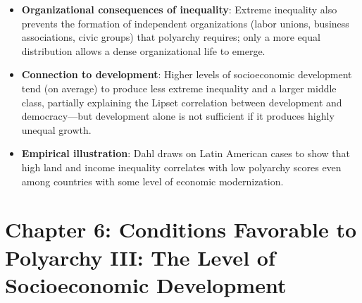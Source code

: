 \documentclass[12pt]{article}
\begin{document}
\begin{itemize}[leftmargin=*, itemsep=4pt]
    \item \textbf{Organizational consequences of inequality}: Extreme inequality also prevents the formation of independent organizations (labor unions, business associations, civic groups) that polyarchy requires; only a more equal distribution allows a dense organizational life to emerge.
    \item \textbf{Connection to development}: Higher levels of socioeconomic development tend (on average) to produce less extreme inequality and a larger middle class, partially explaining the Lipset correlation between development and democracy---but development alone is not sufficient if it produces highly unequal growth.
    \item \textbf{Empirical illustration}: Dahl draws on Latin American cases to show that high land and income inequality correlates with low polyarchy scores even among countries with some level of economic modernization.
\end{itemize}

\section{Chapter 6: Conditions Favorable to Polyarchy III: The Level of Socioeconomic Development}
\end{document}
